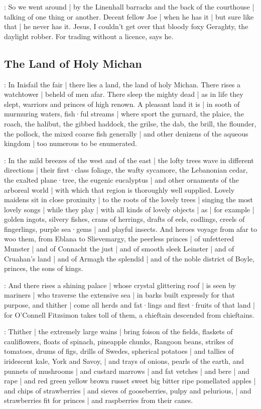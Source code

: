 \Nq:
So we went around |
by the Linenhall barracks and the back of the courthouse |
talking of one thing or another.
Decent fellow Joe |
when he has it |
but sure like that |
he never has it.
Jesus,
I couldn't get over that bloody foxy Geraghty,
the daylight robber.
For trading without a licence,
says he.


\subsection*{The Land of Holy Michan}

:
In Inisfail the fair |
there lies a land,
the land of holy Michan.
There rises a watchtower |
beheld of men afar.
There sleep the mighty dead |
as in life they slept,
warriors and princes of high renown.
A pleasant land it is |
in sooth of murmuring waters,
fish·ful streams |
where sport the gurnard,
the plaice,
the roach,
the halibut,
the gibbed haddock,
the grilse,
the dab,
the brill,
the flounder,
the pollock,
the mixed coarse fish generally |
and other denizens of the aqueous kingdom |
too numerous to be enumerated.

:
In the mild breezes of the west and of the east |
the lofty trees wave in different directions |
their first·class foliage,
the wafty sycamore,
the Lebanonian cedar,
the exalted plane·tree,
the eugenic eucalyptus |
and other ornaments of the arboreal world |
with which that region is thoroughly well supplied.
Lovely maidens sit in close proximity |
to the roots of the lovely trees |
singing the most lovely songs
 |
while they play |
with all kinds of lovely objects |
as |
for example |
golden ingots,
silvery fishes,
crans of herrings,
drafts of eels,
codlings,
creels of fingerlings,
purple sea·gems |
and playful insects.
And heroes voyage from afar to woo them,
from Eblana to Slievemargy,
the peerless princes |
of unfettered Munster |
and of Connacht the just |
and of smooth sleek Leinster |
and of Cruahan's land |
and of Armagh the splendid |
and of the noble district of Boyle,
princes,
the sons of kings.

:
And there rises a shining palace |
whose crystal glittering roof |
is seen by mariners |
who traverse the extensive sea |
in barks built expressly for that purpose,
and thither |
come all herds
and fat·lings
and first·fruits
of that land |
for O'Connell Fitzsimon takes toll of them,
a chieftain descended from chieftains.

:
Thither |
the extremely large wains |
bring foison of the fields,
flaskets of cauliflowers,
floats of spinach,
pineapple chunks,
Rangoon beans,
strikes of tomatoes,
drums of figs,
drills of Swedes,
spherical potatoes |
and tallies of iridescent kale,
York and Savoy, |
and trays of onions,
pearls of the earth,
and punnets of mushrooms |
and custard marrows |
and fat vetches |
and bere |
and rape |
and red green yellow brown russet sweet big bitter ripe pomellated apples |
and chips of strawberries |
and sieves of gooseberries,
pulpy and pelurious, |
and strawberries fit for princes |
and raspberries from their canes.

